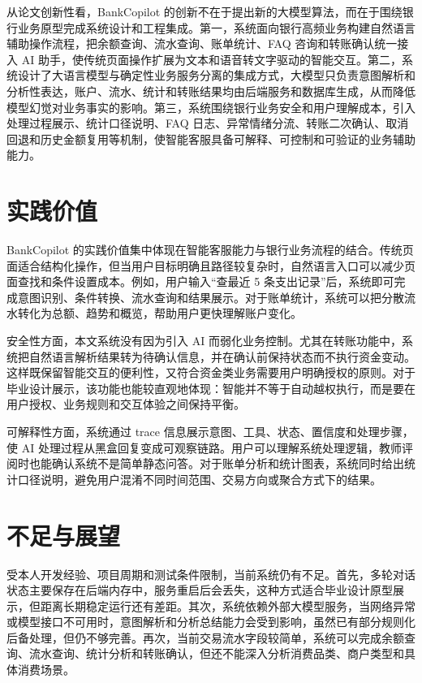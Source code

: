 \documentclass[bachelor, print]{xduthesis}
\begin{document}
从论文创新性看，BankCopilot 的创新不在于提出新的大模型算法，而在于围绕银行业务原型完成系统设计和工程集成。第一，系统面向银行高频业务构建自然语言辅助操作流程，把余额查询、流水查询、账单统计、FAQ 咨询和转账确认统一接入 AI 助手，使传统页面操作扩展为文本和语音转文字驱动的智能交互。第二，系统设计了大语言模型与确定性业务服务分离的集成方式，大模型只负责意图解析和分析性表达，账户、流水、统计和转账结果均由后端服务和数据库生成，从而降低模型幻觉对业务事实的影响。第三，系统围绕银行业务安全和用户理解成本，引入处理过程展示、统计口径说明、FAQ 日志、异常情绪分流、转账二次确认、取消回退和历史金额复用等机制，使智能客服具备可解释、可控制和可验证的业务辅助能力。

\section{实践价值}

BankCopilot 的实践价值集中体现在智能客服能力与银行业务流程的结合。传统页面适合结构化操作，但当用户目标明确且路径较复杂时，自然语言入口可以减少页面查找和条件设置成本。例如，用户输入“查最近 5 条支出记录”后，系统即可完成意图识别、条件转换、流水查询和结果展示。对于账单统计，系统可以把分散流水转化为总额、趋势和概览，帮助用户更快理解账户变化。

安全性方面，本文系统没有因为引入 AI 而弱化业务控制。尤其在转账功能中，系统把自然语言解析结果转为待确认信息，并在确认前保持状态而不执行资金变动。这样既保留智能交互的便利性，又符合资金类业务需要用户明确授权的原则。对于毕业设计展示，该功能也能较直观地体现：智能并不等于自动越权执行，而是要在用户授权、业务规则和交互体验之间保持平衡。

可解释性方面，系统通过 trace 信息展示意图、工具、状态、置信度和处理步骤，使 AI 处理过程从黑盒回复变成可观察链路。用户可以理解系统处理逻辑，教师评阅时也能确认系统不是简单静态问答。对于账单分析和统计图表，系统同时给出统计口径说明，避免用户混淆不同时间范围、交易方向或聚合方式下的结果。

\section{不足与展望}

受本人开发经验、项目周期和测试条件限制，当前系统仍有不足。首先，多轮对话状态主要保存在后端内存中，服务重启后会丢失，这种方式适合毕业设计原型展示，但距离长期稳定运行还有差距。其次，系统依赖外部大模型服务，当网络异常或模型接口不可用时，意图解析和分析总结能力会受到影响，虽然已有部分规则化后备处理，但仍不够完善。再次，当前交易流水字段较简单，系统可以完成余额查询、流水查询、统计分析和转账确认，但还不能深入分析消费品类、商户类型和具体消费场景。
\end{document}

